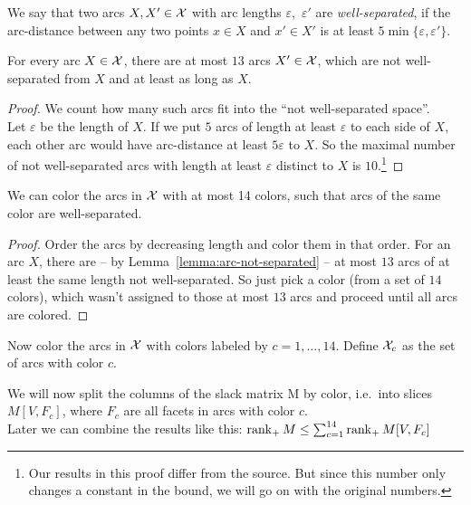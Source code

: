 \begin{definition}
  We say that two arcs $X,X' \in \mathcal{X}$ with arc lengths $\varepsilon$,~$\varepsilon'$ are \emph{well-separated}, if the arc-distance between any two points $x \in X$ and $x' \in X'$ is at least $5 \min\{\varepsilon, \varepsilon'\}$.
\end{definition}

\begin{lemma}\label{lemma:arc-not-separated}
  For every arc $X \in \mathcal{X}$, there are at most $13$ arcs $X' \in \mathcal{X}$, which are not well-separated from $X$ and at least as long as $X$.
\end{lemma}

\begin{proof}
  We count how many such arcs fit into the ``not well-separated space''.\\
  Let $\varepsilon$ be the length of $X$. If we put $5$ arcs of length at least $\varepsilon$ to each side of $X$, each other arc would have arc-distance at least $5\varepsilon$ to $X$. So the maximal number of not well-separated arcs with length at least $\varepsilon$ distinct to $X$ is $10$.\footnote{Our results in this proof differ from the source. But since this number only changes a constant in the bound, we will go on with the original numbers.} 
\end{proof}

\begin{lemma}
  We can color the arcs in $\mathcal{X}$ with at most 14 colors, such that arcs of the same color are well-separated.
\end{lemma}

\begin{proof}
  Order the arcs by decreasing length and color them in that order. For an arc $X$, there are -- by Lemma~\ref{lemma:arc-not-separated} -- at most $13$ arcs of at least the same length not well-separated. So just pick a color (from a set of $14$ colors), which wasn't assigned to those at most $13$ arcs and proceed until all arcs are colored.
\end{proof}

Now color the arcs in $\mathcal{X}$ with colors labeled by $c=1,\dots,14$. Define $\mathcal{X}_c$ as the set of arcs with color $c$.

We will now split the columns of the slack matrix M by color, i.e.\ into slices $M[V,F_c]$, where $F_c$ are all facets in arcs with color $c$.\\
Later we can combine the results like this: $\operatorname{rank}_+M \leq \sum_{c=1}^{14} \operatorname{rank}_+ M[V,F_c]$

